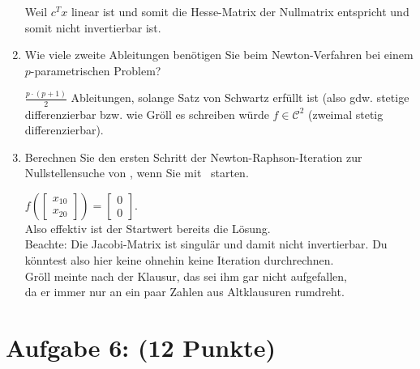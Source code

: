 \documentclass[12pt]{article}
\begin{document}
\begin{enumerate}
	\begin{solution}
		Weil $c^T x$ linear ist und somit die Hesse-Matrix der Nullmatrix entspricht und somit nicht invertierbar ist.
	\end{solution}

	\item Wie viele zweite Ableitungen benötigen Sie beim Newton-Verfahren bei einem $p$-parametrischen Problem?
	
	\begin{solution}
		$\frac{p\cdot(p+1)}{2}$ Ableitungen, solange Satz von Schwartz erfüllt ist (also gdw. stetige differenzierbar bzw. wie Gröll es schreiben würde $f\in \mathcal{C}^2$ (zweimal stetig differenzierbar).
	\end{solution}	
	
\pagebreak
	\item Berechnen Sie den ersten Schritt der Newton-Raphson-Iteration zur Nullstellensuche von \raphsonFunction, wenn Sie mit \raphsonStartVal\, starten.
	\begin{solution}
		$f(\begin{bmatrix}x_{10} \\ x_{20}\end{bmatrix}) = \begin{bmatrix}0 \\ 0\end{bmatrix}$.\\
		Also effektiv ist der Startwert bereits die Lösung.\\
		Beachte: Die Jacobi-Matrix ist singulär und damit nicht invertierbar. Du könntest also hier keine ohnehin keine Iteration durchrechnen.\\
		Gröll meinte nach der Klausur, das sei ihm gar nicht aufgefallen,\\da er immer nur an ein paar Zahlen aus Altklausuren rumdreht.
	\end{solution}	
	

\end{enumerate}

\pagebreak
\section*{Aufgabe 6: (12 Punkte)}
\end{document}
